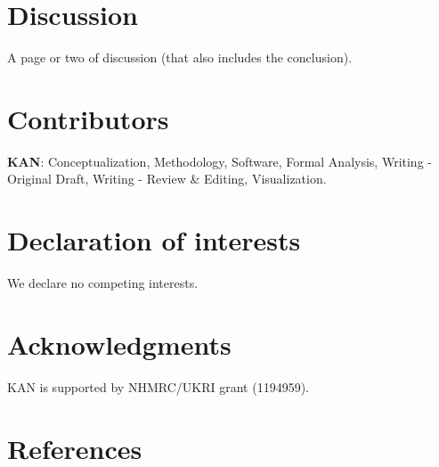 \documentclass[preprint,12pt]{elsarticle}
\begin{document}
\section{Discussion}
A page or two of discussion (that also includes the conclusion).

\section{Contributors}\label{sec:credit}
\textbf{KAN}: Conceptualization, Methodology, Software, Formal Analysis, Writing - Original Draft, Writing - Review \& Editing, Visualization.

\section{Declaration of interests}\label{sec:dec}
We declare no competing interests.

\section{Acknowledgments}\label{sec:ak}
KAN is supported by NHMRC/UKRI grant (1194959).







\section{References}\label{sec:ref}
\begin{thebibliography}{00}


 



\end{thebibliography}
\end{document}
